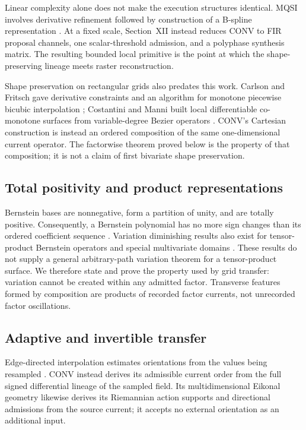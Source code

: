\documentclass[journal]{IEEEtran}
\begin{document}
Linear complexity alone does not make the execution structures identical.
MQSI involves derivative refinement followed by construction of a B-spline
representation \cite{lux2023}. At a fixed scale, Section~XII instead reduces
CONV to FIR proposal channels, one scalar-threshold admission, and a
polyphase synthesis matrix. The resulting bounded local primitive is the
point at which the shape-preserving lineage meets raster reconstruction.

Shape preservation on rectangular grids also predates this work. Carlson and
Fritsch gave derivative constraints and an algorithm for monotone piecewise
bicubic interpolation \cite{carlsonfritsch1989}; Costantini and Manni built
local differentiable co-monotone surfaces from variable-degree Bezier
operators \cite{costantinimanni1991}. CONV's Cartesian construction is instead
an ordered composition of the same one-dimensional current operator. The
factorwise theorem proved below is the property of that composition; it is not
a claim of first bivariate shape preservation.

\subsection{Total positivity and product representations}

Bernstein bases are nonnegative, form a partition of unity, and are totally
positive. Consequently, a Bernstein polynomial has no more sign changes than
its ordered coefficient sequence \cite{karlin1968,pinkus2010}. Variation
diminishing results also exist for tensor-product Bernstein operators and
special multivariate domains \cite{cavaretta1987,goodman1987}. These results
do not supply a general arbitrary-path variation theorem for a tensor-product
surface. We therefore state and prove the property used by grid transfer:
variation cannot be created within any admitted factor. Transverse features
formed by composition are products of recorded factor currents, not
unrecorded factor oscillations.

\subsection{Adaptive and invertible transfer}

Edge-directed interpolation estimates orientations from the values being
resampled \cite{li2001,lottes2021}. CONV instead derives its admissible
current order from the full signed differential lineage of the sampled
field. Its multidimensional Eikonal geometry likewise derives its Riemannian
action supports and directional admissions from the source current; it
accepts no external orientation as an additional input.
\end{document}
